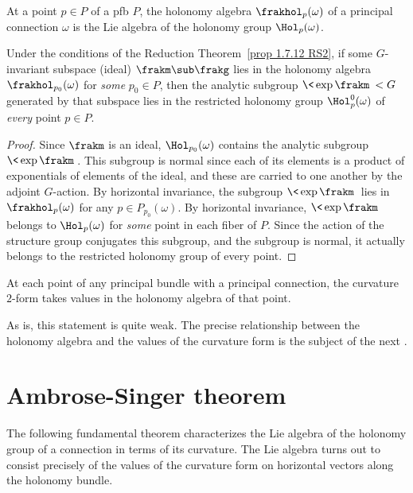 \begin{defn}
    At a point $p\in P$ of a \gls{pfb} $P$, the holonomy algebra $\frakhol_{p}(\omega)$ of a principal connection $\omega$ is the Lie algebra of the holonomy group $\Hol_p(\omega)$.
\end{defn}

\begin{cor}\label{cor 16.18 McKay}
    Under the conditions of the Reduction Theorem~\ref{prop 1.7.12 RS2}, if some $G$-invariant subspace (ideal) $\frakm\sub \frakg$ lies in the holonomy algebra $\frakhol_{p_0}(\omega)$ for \emph{some} $p_0\in P$, then the analytic subgroup $\<\exp\frakm\><G$ generated by that subspace lies in the restricted holonomy group $\Hol_p^0(\omega)$ of \emph{every} point $p\in P$.
\end{cor}
\begin{proof}
    Since $\frakm$ is an ideal, $\Hol_{p_0}(\omega)$ contains the analytic subgroup $\<\exp\frakm\>$. This subgroup is normal since each of its elements is a product of exponentials of elements of the ideal, and these are carried to one another by the adjoint $G$-action. By horizontal invariance, the subgroup $\<\exp\frakm\>$ lies in $\frakhol_p(\omega)$ for any $p\in P_{p_0}(\omega)$. By horizontal invariance, $\<\exp\frakm\>$ belongs to $\Hol_p(\omega)$ for \emph{some} point in each fiber of $P$. Since the action of the structure group conjugates this subgroup, and the subgroup is normal, it actually belongs to the restricted holonomy group of every point.
\end{proof}


\begin{cor}\label{cor 16.19 McKay}
    At each point of any principal bundle with a principal connection, the curvature $2$-form takes values in the holonomy algebra of that point.
\end{cor}

As is, this statement is quite weak. The precise relationship between the holonomy algebra and the values of the curvature form is the subject of the next \sect.






\section{Ambrose-Singer theorem}


The following fundamental theorem characterizes the Lie algebra of the holonomy group of a connection in terms of its curvature. The Lie algebra turns out to consist precisely of the values of the curvature form on horizontal vectors along the holonomy bundle.

